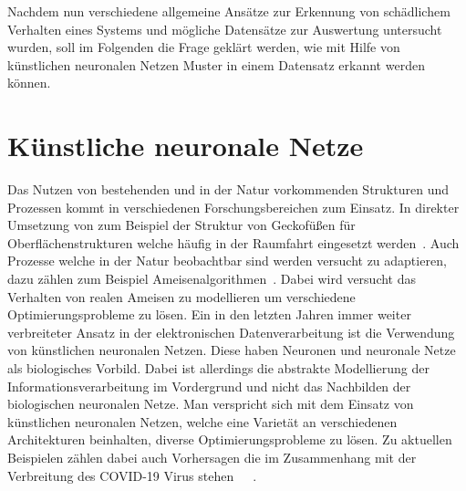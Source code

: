                 Nachdem nun verschiedene allgemeine Ansätze zur Erkennung von schädlichem Verhalten eines Systems und mögliche Datensätze zur Auswertung untersucht wurden,
                soll im Folgenden die Frage geklärt werden, wie mit Hilfe von künstlichen neuronalen Netzen Muster in einem Datensatz erkannt werden können.

    \section{Künstliche neuronale Netze}\label{sec:KNN}        
        Das Nutzen von bestehenden und in der Natur vorkommenden Strukturen und Prozessen kommt in verschiedenen Forschungsbereichen zum Einsatz.
        In direkter Umsetzung von zum Beispiel der Struktur von Geckofüßen für Oberflächenstrukturen welche häufig in der Raumfahrt eingesetzt werden~\cite{GECKO}.
        Auch Prozesse welche in der Natur beobachtbar sind werden versucht zu adaptieren, dazu zählen zum Beispiel Ameisenalgorithmen~\cite{ANT}.
        Dabei wird versucht das Verhalten von realen Ameisen zu modellieren um verschiedene Optimierungsprobleme zu lösen.
        Ein in den letzten Jahren immer weiter verbreiteter Ansatz in der elektronischen Datenverarbeitung ist die Verwendung von künstlichen neuronalen Netzen.
        Diese haben Neuronen und neuronale Netze als biologisches Vorbild.
        Dabei ist allerdings die abstrakte Modellierung der Informationsverarbeitung im Vordergrund und nicht das Nachbilden der biologischen neuronalen Netze.
        Man verspricht sich mit dem Einsatz von künstlichen neuronalen Netzen, welche eine Varietät an verschiedenen Architekturen beinhalten, diverse Optimierungsprobleme zu lösen.
        Zu aktuellen Beispielen zählen dabei auch Vorhersagen die im Zusammenhang mit der Verbreitung des COVID-19 Virus stehen~\cite{COVID1}~\cite{COVID2}~\cite{COVID3}.
        
